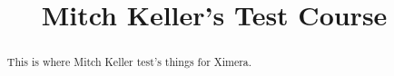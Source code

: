 \documentclass{xourse}
\title{Mitch Keller's Test Course}
\begin{document}
  
\begin{abstract} %
This is where Mitch Keller test's things for Ximera.
\end{abstract}  
\maketitle  
 
 
\end{document}
